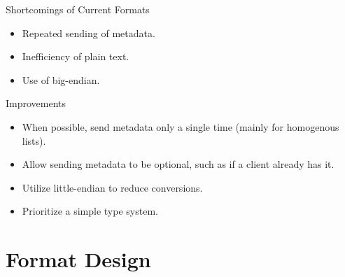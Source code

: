 \documentclass{beamer}
\begin{document}
\begin{frame}{Shortcomings of Current Formats}
	\begin{itemize}
		\item Repeated sending of metadata.
		\item Inefficiency of plain text.
		\item Use of big-endian.
	\end{itemize}
\end{frame}

\begin{frame}{Improvements}
	\begin{itemize}
		\item When possible, send metadata only a single time (mainly for homogenous lists).
		\item Allow sending metadata to be optional, such as if a client already has it.
		\item Utilize little-endian to reduce conversions.
		\item Prioritize a simple type system.
	\end{itemize}
\end{frame}

\section{Format Design}
\end{document}
